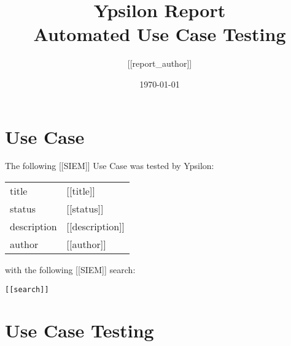 \documentclass{article}
\title{Ypsilon Report \\ Automated Use Case Testing} %
\author{[[report_author]]} %
\date{\today} %
\begin{document}
\maketitle %


\section{Use Case}

The following [[SIEM]] Use Case was tested by Ypsilon:

\begin{center}
\begin{tabularx}{\textwidth}{ l X }
title & [[title]] \\
status & [[status]] \\
description & [[description]] \\
author & [[author]] 
\end{tabularx}
\end{center}

with the following [[SIEM]] search:

\begin{lstlisting}[frame=single]
[[search]]
\end{lstlisting}

\section{Use Case Testing}
\end{document}
